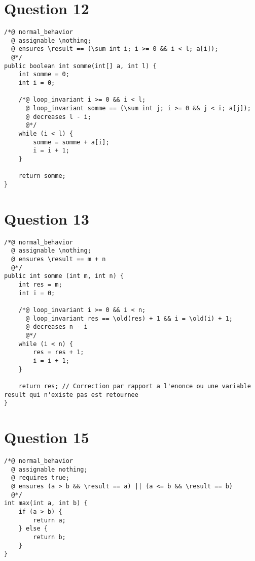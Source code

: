\documentclass{article}
\begin{document}
\section{Question 12}
\begin{lstlisting}
/*@ normal_behavior
  @ assignable \nothing;
  @ ensures \result == (\sum int i; i >= 0 && i < l; a[i]);
  @*/
public boolean int somme(int[] a, int l) {
	int somme = 0;
	int i = 0;
	
	/*@ loop_invariant i >= 0 && i < l;
	  @ loop_invariant somme == (\sum int j; i >= 0 && j < i; a[j]);
	  @ decreases l - i;
	  @*/
	while (i < l) {
		somme = somme + a[i];
		i = i + 1;
	}
	
	return somme;
}
\end{lstlisting}

\section{Question 13}
\begin{lstlisting}
/*@ normal_behavior
  @ assignable \nothing;
  @ ensures \result == m + n
  @*/
public int somme (int m, int n) {
	int res = m;
	int i = 0;
	
	/*@ loop_invariant i >= 0 && i < n;
	  @ loop_invariant res == \old(res) + 1 && i = \old(i) + 1;
	  @ decreases n - i
	  @*/
	while (i < n) {
		res = res + 1;
		i = i + 1;
	}
	
	return res; // Correction par rapport a l'enonce ou une variable result qui n'existe pas est retournee
}	
\end{lstlisting}

\section{Question 15}
\begin{lstlisting}
/*@ normal_behavior
  @ assignable nothing;
  @ requires true;
  @ ensures (a > b && \result == a) || (a <= b && \result == b)
  @*/
int max(int a, int b) {
	if (a > b) {
		return a;
	} else {
		return b;
	}
}
\end{lstlisting}
\end{document}
